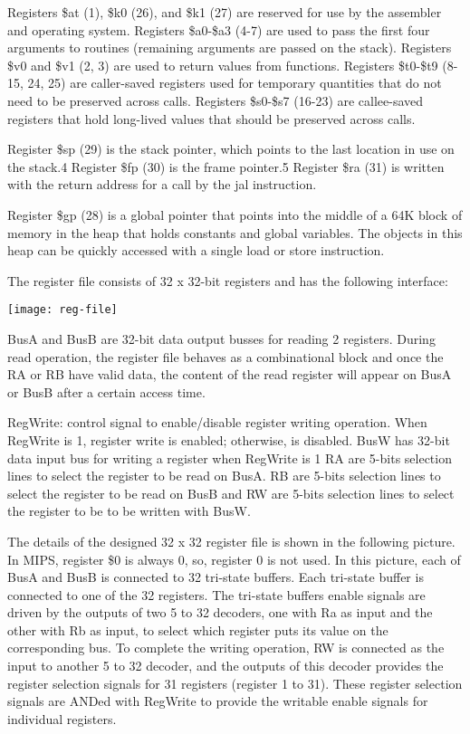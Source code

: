 \documentclass[12pt]{report}
\begin{document}
Registers \$at (1), \$k0 (26), and \$k1 (27) are reserved for use by the assembler and operating system.
Registers \$a0-\$a3 (4-7) are used to pass the first four arguments to routines (remaining arguments are passed on the stack). Registers \$v0 and \$v1 (2, 3) are used to return values from functions. Registers \$t0-\$t9 (8-15, 24, 25) are caller-saved registers used for temporary quantities that do not need to be preserved across calls. Registers \$s0-\$s7 (16-23) are callee-saved registers that hold long-lived values that should be preserved across calls.

Register \$sp (29) is the stack pointer, which points to the last location in use on the stack.4 Register \$fp (30) is the frame pointer.5 Register \$ra (31) is written with the return address for a call by the jal instruction.

Register \$gp (28) is a global pointer that points into the middle of a 64K block of memory in the heap that holds constants and global variables. The objects in this heap can be quickly accessed with a single load or store instruction.

The register file consists of 32 x 32-bit registers and has the following interface:
\begin{center}
		\texttt{[image: reg-file]}%
					\label{fig:fileInterface}%
	\end{center}
BusA and BusB are 32-bit data output busses for reading 2 registers. During read operation, the register file behaves as a combinational block and once the RA or RB have valid data, the content of the read register will appear on BusA or BusB after a certain access time.

RegWrite: control signal to enable/disable register writing operation. When RegWrite is 1, register write is enabled; otherwise, is disabled.
BusW has 32-bit data input bus for writing a register when RegWrite is 1
RA are 5-bits selection lines to select the register to be read on BusA.
RB are 5-bits selection lines to select the register to be read on BusB
and RW are 5-bits selection lines to select the register to be to be written with BusW.

The details of the designed 32 x 32 register file is shown in the following picture. In MIPS, register \$0 is always 0, so, register 0 is not used. In this picture, each of BusA and BusB is connected to 32 tri-state buffers. Each tri-state buffer is connected to one of the 32 registers. The tri-state buffers enable signals are driven by the outputs of two 5 to 32 decoders, one with Ra as input and the other with Rb as input, to select which register puts its value on the corresponding bus. To complete the writing operation, RW is connected as the input to another 5 to 32 decoder, and the outputs of this decoder provides the register selection signals for 31 registers (register 1 to 31). These register selection signals are ANDed with RegWrite to provide the writable enable signals for individual registers. 
\end{document}
